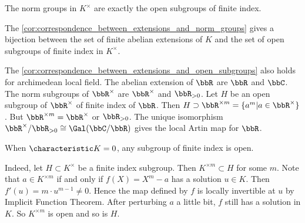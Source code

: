   \begin{theorem}\label{thm:norm_groups_are_exactly_open_subgroups_of_finite_index}
    The norm groups in $K^\times$ are exactly the open subgroups of finite index.
  \end{theorem}

  \begin{corollary}\label{cor:correspondence_between_extensions_and_open_subgroups}
    The \cref{cor:correspondence_between_extensions_and_norm_groups} gives a bijection between the set of finite abelian extensions of $K$ and the set of open subgroups of finite index in $K^\times$.
  \end{corollary}

  \begin{remark}
    The \cref{cor:correspondence_between_extensions_and_open_subgroups} also holds for archimedean local field.
    The abelian extension of $\bbR$ are $\bbR$ and $\bbC$.
    The norm subgroups of $\bbR^\times$ are $\bbR^\times$ and $\bbR_{>0}$.
    Let $H$ be an open subgroup of $\bbR^\times$ of finite index of $\bbR$.
    Then $H \supset \bbR^{\times m} = \{a^m|a \in \bbR^\times\}$.
    But $\bbR^{\times m} = \bbR^{\times}$ or $\bbR_{>0}$.
    The unique isomorphism $\bbR^\times / \bbR_{>0} \cong \Gal(\bbC/\bbR)$ gives the local Artin map for $\bbR$.
  \end{remark}

  \begin{remark}
    When $\characteristic K = 0$, any subgroup of finite index is open.

    Indeed, let $H \subset K^\times$ be a finite index subgroup.
    Then $K^{\times m} \subset H$ for some $m$.
    Note that $a \in K^{\times m}$ if and only if $f(X) = X^m - a$ has a solution $u \in K$.
    Then $f'(u) = m \cdot u^{m-1} \neq 0$.
    Hence the map defined by $f$ is locally invertible at $u$ by Implicit Function Theorem.
    After perturbing $a$ a little bit, $f$ still has a solution in $K$.
    So $K^{\times m}$ is open and so is $H$.
  \end{remark}